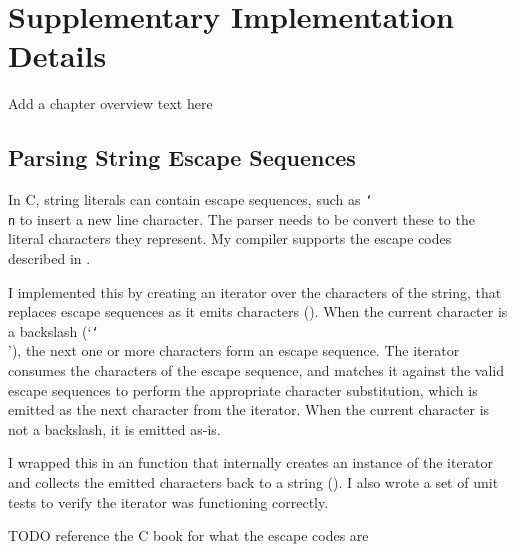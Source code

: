 \documentclass[../00-main.tex]{subfiles}
\begin{document}
\chapter{Supplementary Implementation Details}

\begin{mrwComment}
Add a chapter overview text here
\end{mrwComment}

\section{Parsing String Escape Sequences}

In C, string literals can contain escape sequences, such as \texttt{\char`\\n} to insert a new line character.
The parser needs to be convert these to the literal characters they represent.
My compiler supports the escape codes described in .

I implemented this by creating an iterator over the characters of the string, that replaces escape sequences as it emits characters ().
When the current character is a backslash (`\texttt{\char`\\}'), the next one or more characters form an escape sequence.
The iterator consumes the characters of the escape sequence, and matches it against the valid escape sequences to perform the appropriate character substitution, which is emitted as the next character from the iterator.
When the current character is not a backslash, it is emitted as-is.

I wrapped this in an  function that internally creates an instance of the iterator and collects the emitted characters back to a string ().
I also wrote a set of unit tests to verify the iterator was functioning correctly.

\begin{mrwComment}
TODO reference the C book for what the escape codes are
\end{mrwComment}
\end{document}
